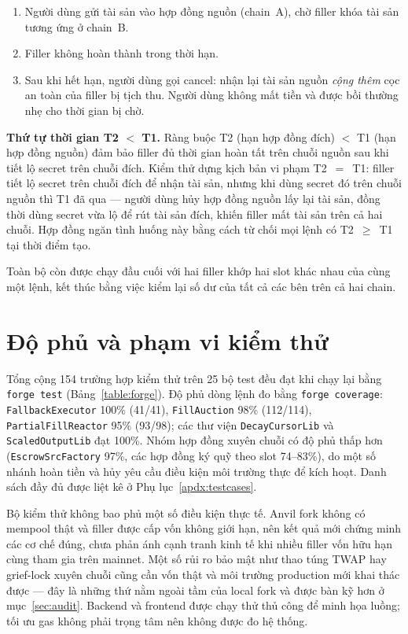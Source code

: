 \documentclass[../DoAn.tex]{subfiles}
\begin{document}
\begin{enumerate}
    \item Người dùng gửi tài sản vào hợp đồng nguồn (chain~A), chờ filler khóa tài sản tương ứng ở chain~B.
    \item Filler không hoàn thành trong thời hạn.
    \item Sau khi hết hạn, người dùng gọi cancel: nhận lại tài sản nguồn \emph{cộng thêm} cọc an toàn của filler bị tịch thu. Người dùng không mất tiền và được bồi thường nhẹ cho thời gian bị chờ.
\end{enumerate}

\textbf{Thứ tự thời gian T2 $<$ T1.} Ràng buộc T2 (hạn hợp đồng đích) $<$ T1 (hạn hợp đồng nguồn) đảm bảo filler đủ thời gian hoàn tất trên chuỗi nguồn sau khi tiết lộ secret trên chuỗi đích. Kiểm thử  dựng kịch bản vi phạm T2~$=$~T1: filler tiết lộ secret trên chuỗi đích để nhận tài sản, nhưng khi dùng secret đó trên chuỗi nguồn thì T1 đã qua --- người dùng hủy hợp đồng nguồn lấy lại tài sản, đồng thời dùng secret vừa lộ để rút tài sản đích, khiến filler mất tài sản trên cả hai chuỗi. Hợp đồng ngăn tình huống này bằng cách từ chối mọi lệnh có T2~$\geq$~T1 tại thời điểm tạo.

Toàn bộ còn được chạy đầu cuối với hai filler khớp hai slot khác nhau của cùng một lệnh, kết thúc bằng việc kiểm lại số dư của tất cả các bên trên cả hai chain.

\section{Độ phủ và phạm vi kiểm thử}
\label{sec:test-coverage}

Tổng cộng 154 trường hợp kiểm thử trên 25 bộ test đều đạt khi chạy lại bằng \texttt{forge test} (Bảng~\ref{table:forge}). Độ phủ dòng lệnh đo bằng \texttt{forge coverage}: \texttt{FallbackExecutor} 100\% (41/41), \texttt{FillAuction} 98\% (112/114), \texttt{PartialFillReactor} 95\% (93/98); các thư viện \texttt{DecayCursorLib} và \texttt{ScaledOutputLib} đạt 100\%. Nhóm hợp đồng xuyên chuỗi có độ phủ thấp hơn (\texttt{EscrowSrcFactory} 97\%, các hợp đồng ký quỹ theo slot 74--83\%), do một số nhánh hoàn tiền và hủy yêu cầu điều kiện môi trường thực để kích hoạt. Danh sách đầy đủ được liệt kê ở Phụ lục~\ref{apdx:testcases}.

Bộ kiểm thử không bao phủ một số điều kiện thực tế. Anvil fork không có mempool thật và filler được cấp vốn không giới hạn, nên kết quả mới chứng minh các cơ chế đúng, chưa phản ánh cạnh tranh kinh tế khi nhiều filler vốn hữu hạn cùng tham gia trên mainnet. Một số rủi ro bảo mật như thao túng TWAP hay grief-lock xuyên chuỗi cũng cần vốn thật và môi trường production mới khai thác được --- đây là những thứ nằm ngoài tầm của local fork và được bàn kỹ hơn ở mục~\ref{sec:audit}. Backend và frontend được chạy thử thủ công để minh họa luồng; tối ưu gas không phải trọng tâm nên không được đo hệ thống.
\end{document}
